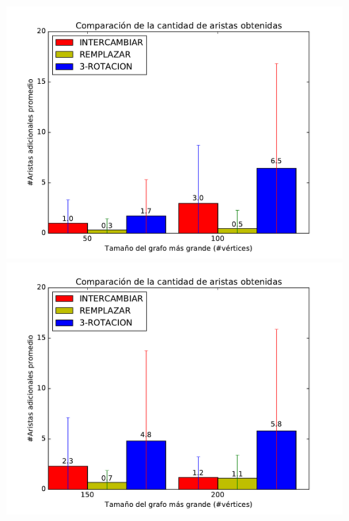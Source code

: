 \begin{figure}[H]
\centering
\begin{minipage}{0.49\textwidth}
  \centering
    \includegraphics[width=1\textwidth]{graficos/problema_5/calidad0.pdf}
  \caption{}
  \label{fig:5-calidad1}
\end{minipage}%
\hspace{0.01\textwidth}
\begin{minipage}{0.49\textwidth}   
  \centering
    \includegraphics[width=1\textwidth]{graficos/problema_5/calidad2.pdf} 
  \caption{}
  \label{fig:5-calidad2}
\end{minipage}


\end{figure}
